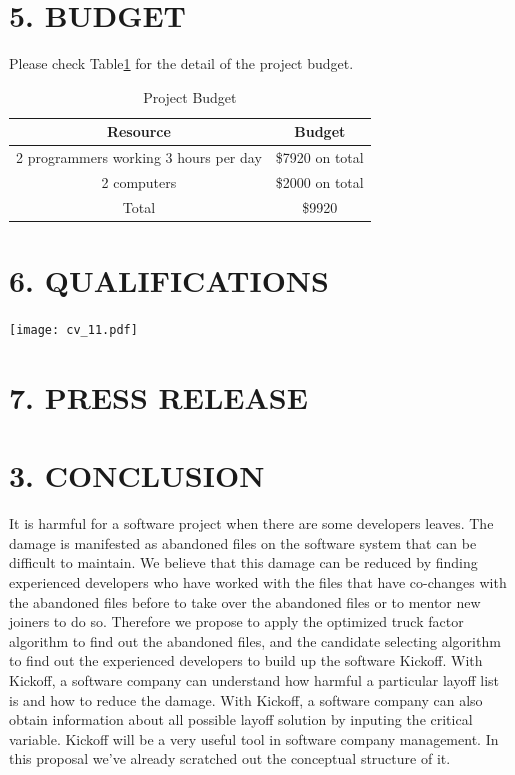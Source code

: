 \documentclass[12pt, a4paper, openright]{report}
\begin{document}
\section* {5. BUDGET}
Please check Table\ref{budget} for the detail of the project budget.
\begin{table}[h]		
	\centering            
	\caption{Project Budget}            
	\begin{tabular}{|c|c|}            
		\hline Resource & Budget   \\ \hline
		2 programmers working 3 hours per day& \$7920 on total \\ \hline
        2 computers& \$2000 on total \\ \hline
        Total& \$9920  \\ \hline
	\end{tabular}            
	\label{budget}            
\end{table}

\newpage
\section* {6. QUALIFICATIONS}
\begin{center}
	\texttt{[image: cv\_11.pdf]}
	\label{structure}
\end{center}
\newpage
\section* {7. PRESS RELEASE}


\newpage
\section*{3. CONCLUSION}
It is harmful for a software project when there are some developers leaves. The damage is manifested as abandoned
files on the software system that can be difficult to maintain.
We believe that this damage can be reduced by finding experienced developers who have worked with the files that have co-changes with the abandoned files before to take over the abandoned files or to mentor new joiners to do so. Therefore we propose to apply the optimized truck factor algorithm to find out the abandoned files, and the candidate selecting algorithm to find out the experienced developers to build up the software Kickoff. With Kickoff, a software company can understand how harmful a particular layoff list is and how to reduce the damage. With Kickoff, a software company can also obtain information about all possible layoff solution by inputing the critical variable. Kickoff will be a very useful tool in software company management. In this proposal we've already scratched out the conceptual structure of it.
\end{document}
